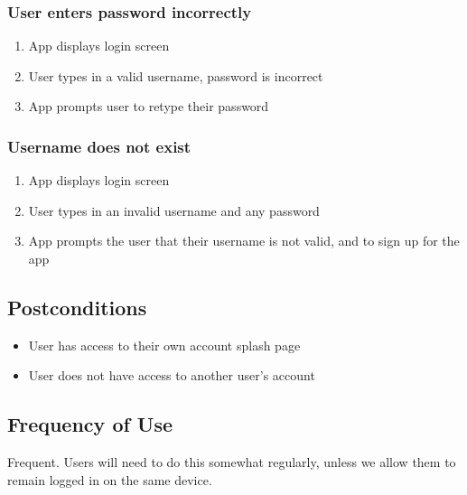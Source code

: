 \documentclass{article}
\begin{document}
		\subsubsection{User enters password incorrectly}
			\begin{enumerate}
				\item App displays login screen
				\item User types in a valid username, password is incorrect
				\item App prompts user to retype their password
			\end{enumerate}
		\subsubsection{Username does not exist}
		\begin{enumerate}
			\item App displays login screen
			\item User types in an invalid username and any password
			\item App prompts the user that their username is not valid, and to sign up for the app
		\end{enumerate}
	\subsection{Postconditions}
	\begin{itemize}
		\item User has access to their own account splash page
		\item User does not have access to another user's account
	\end{itemize}

	\subsection{Frequency of Use}
	Frequent. Users will need to do this somewhat regularly, unless we allow them to remain logged in on the same device.
\end{document}
